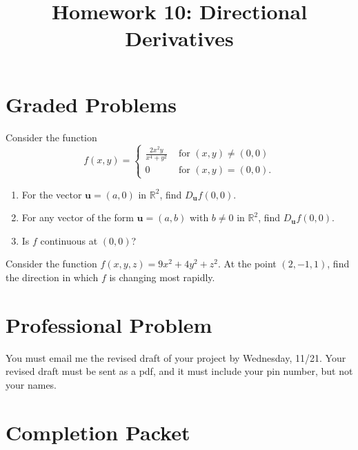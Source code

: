\documentclass{ximera}
\title{Homework 10: Directional Derivatives}
\begin{document}
\begin{abstract}
\end{abstract}
\maketitle

\section*{Graded Problems}

\begin{problem} Consider the function
\[
f(x,y) = \begin{cases}
\frac{2x^2y}{x^4+y^2} & \textrm{ for }(x,y)\neq(0,0)\\
0 & \textrm{ for }(x,y)=(0,0).
\end{cases}
\]
\begin{enumerate}
\item For the vector $\mathbf{u} = (a,0)$ in $\mathbb{R}^2$, find $D_\mathbf{u}f(0,0)$.
\item For any vector of the form $\mathbf{u} = (a,b)$ with $b\neq 0$ in $\mathbb{R}^2$, find $D_\mathbf{u}f(0,0)$.
\item Is $f$ continuous at $(0,0)$?
\end{enumerate}
\end{problem}

\begin{problem} Consider the function $f(x,y,z) = 9x^2+4y^2+z^2$. At the point $(2,-1,1)$, find the direction in which $f$ is changing most rapidly.
\end{problem}

\section*{Professional Problem}

\begin{problem}
You must email me the revised draft of your project by Wednesday, 11/21. Your revised draft must be sent as a pdf, and it must include your pin number, but not your names.
\end{problem}

\section*{Completion Packet}
\end{document}
